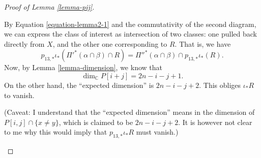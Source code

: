 \begin{proof}[Proof of Lemma \ref{lemma-pij}]
\begin{enumerate}
By Equation \ref{equation-lemma2-1}
and the commutativity of the second diagram,
we can express the class of interest as
intersection
of two classes: one pulled back directly
from $X$,
and the other one corresponding to $R$.
That is, we have
$$
p_{13,*}\iota_*({\Pi'}^* (\alpha\cap
\beta)\cap R)
={\Pi''}^* (\alpha \cap \beta)\cap
p_{13,*}\iota_*(R).
$$
Now, by Lemma \ref{lemma-dimension},
we know that
$$
\dim_{\mathbb{C}}P[i+j]=2n-i-j+1.
$$
On the other hand, the ``expected dimension''
is $2n-i-j+2$. This obliges $\iota_*R$ to
vanish.

\medskip\noindent
(Caveat: I understand that the ``expected
dimension''
means in \cite{Nakajima-lectures} the
dimension of
$P[i,j]\cap \{x\neq y\}$, which is claimed
to be
$2n-i-j+2$.
It is however not clear to me why this would
imply
that $p_{13,*}\iota_*R$ must vanish.)

\end{enumerate}
\end{proof}





